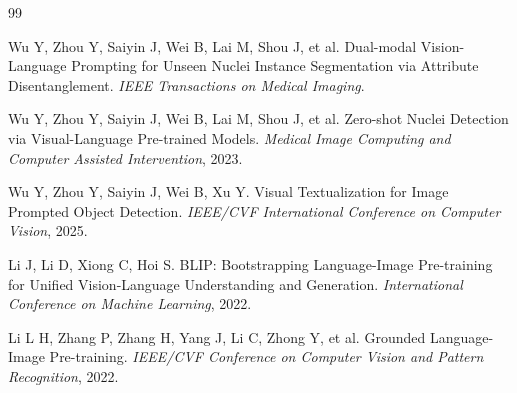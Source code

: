 \clearpage
{}
{}
\begin{thebibliography}{99}

Wu Y, Zhou Y, Saiyin J, Wei B, Lai M, Shou J, et al.
\newblock Dual-modal Vision-Language Prompting for Unseen Nuclei Instance Segmentation via Attribute Disentanglement.
\newblock \emph{IEEE Transactions on Medical Imaging}.

Wu Y, Zhou Y, Saiyin J, Wei B, Lai M, Shou J, et al.
\newblock Zero-shot Nuclei Detection via Visual-Language Pre-trained Models.
\newblock \emph{Medical Image Computing and Computer Assisted Intervention}, 2023.

Wu Y, Zhou Y, Saiyin J, Wei B, Xu Y.
\newblock Visual Textualization for Image Prompted Object Detection.
\newblock \emph{IEEE/CVF International Conference on Computer Vision}, 2025.

Li J, Li D, Xiong C, Hoi S.
\newblock BLIP: Bootstrapping Language-Image Pre-training for Unified Vision-Language Understanding and Generation.
\newblock \emph{International Conference on Machine Learning}, 2022.

Li L H, Zhang P, Zhang H, Yang J, Li C, Zhong Y, et al.
\newblock Grounded Language-Image Pre-training.
\newblock \emph{IEEE/CVF Conference on Computer Vision and Pattern Recognition}, 2022.

\end{thebibliography}
